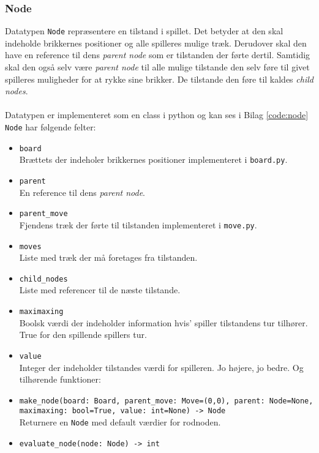 \subsubsection{Node}
Datatypen \texttt{Node} repræsentere en tilstand i spillet. Det betyder at den
skal indeholde brikkernes positioner og alle spilleres mulige træk. Derudover skal
den have en reference til dens \textit{parent node} som er tilstanden der førte dertil. Samtidig skal
den også selv være \textit{parent node} til alle mulige tilstande den selv føre til givet spilleres
muligheder for at rykke sine brikker. De tilstande den føre til kaldes \textit{child nodes}.\\
\\
Datatypen er implementeret som en class i python og kan ses i Bilag \ref{code:node}
\bigbreak
\texttt{Node} har følgende felter:
\begin{itemize}
    \item \texttt{board}\\
    Brættets der indeholer brikkernes positioner implementeret i \texttt{board.py}.
    \item \texttt{parent}\\
    En reference til dens \textit{parent node}.
    \item \texttt{parent\_move}\\
    Fjendens træk der førte til tilstanden implementeret i \texttt{move.py}.
    \item \texttt{moves}\\
    Liste med træk der må foretages fra tilstanden.
    \item \texttt{child\_nodes}\\
    Liste med referencer til de næste tilstande.
    \item \texttt{maximaxing}\\
    Boolsk værdi der indeholder information hvis' spiller tilstandens tur tilhører. True for den spillende spillers tur.
    \item \texttt{value}\\
    Integer der indeholder tilstandes værdi for spilleren. Jo højere, jo bedre.
    \bigbreak
    Og tilhørende funktioner:
    \item \texttt{make\_node(board: Board, parent\_move: Move=(0,0), parent: Node=None, maximaxing: bool=True, value: int=None) -> Node}\\
    Returnere en \texttt{Node} med default værdier for rodnoden.
    \item \texttt{evaluate\_node(node: Node) -> int} \\

\end{itemize}
